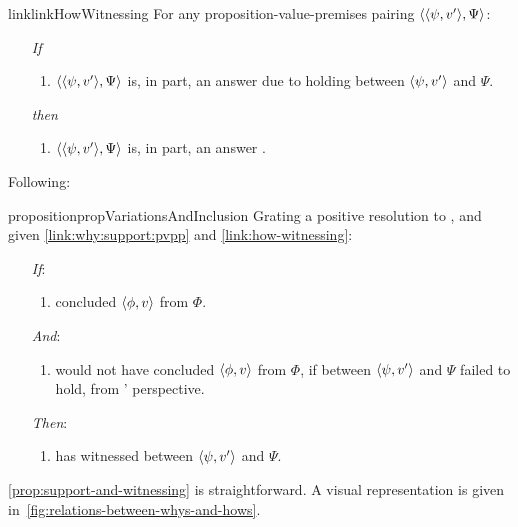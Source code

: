 \begin{note}
  \begin{restatable}{link}{linkHowWitnessing}
    \label{link:how-witnessing}
    For any proposition-value-premises pairing \(\langle \langle \psi, v' \rangle, \Psi \rangle\):
    \begin{itemize}
    \item[\emph{If}]
      \begin{enumerate}[label=\alph*., ref=(\alph*)]
      \item
        \(\langle \langle \psi, v' \rangle, \Psi \rangle\) is, in part, an answer \qHow{} due to \support{} holding between \(\langle \psi, v' \rangle\) and \(\Psi\).
      \end{enumerate}
    \item[\emph{then}]
      \begin{enumerate}[label=\alph*., ref=(\alph*), resume]
      \item
        \(\langle \langle \psi, v' \rangle, \Psi \rangle\) is, in part, an answer \qHowV{}.
      \end{enumerate}
    \end{itemize}
    \vspace{-\baselineskip}
  \end{restatable}
\end{note}



\begin{note}
 Following:

  \begin{restatable}[]{proposition}{propVariationsAndInclusion}
    \label{prop:support-and-witnessing}
    Grating a positive resolution to \issueInclusion{}, and given \autoref{link:why:support:pvpp} and \autoref{link:how-witnessing}:
    \begin{enumerate}
    \item[\emph{If}:]
      \begin{enumerate}[label=\alph*., ref=(\alph*)]
      \item \vAgent{} concluded \(\langle \phi, v \rangle\) from \(\Phi\).
      \end{enumerate}
    \item[\emph{And}:]
      \begin{enumerate}[label=\alph*., ref=(\alph*), resume]
      \item
        \vAgent{} would not have concluded \(\langle \phi, v \rangle\) from \(\Phi\), if \support{} between \(\langle \psi, v' \rangle\) and \(\Psi\) failed to hold, from \vAgent{}' perspective.
      \end{enumerate}
    \item[\emph{Then}:]
      \begin{enumerate}[label=\alph*., ref=(\alph*), resume]
      \item
        \vAgent{} has witnessed \support{} between \(\langle \psi, v' \rangle\) and \(\Psi\).
      \end{enumerate}
    \end{enumerate}
  \end{restatable}

  \autoref{prop:support-and-witnessing} is straightforward.
  A visual representation is given in~\autoref{fig:relations-between-whys-and-hows}.
\end{note}

